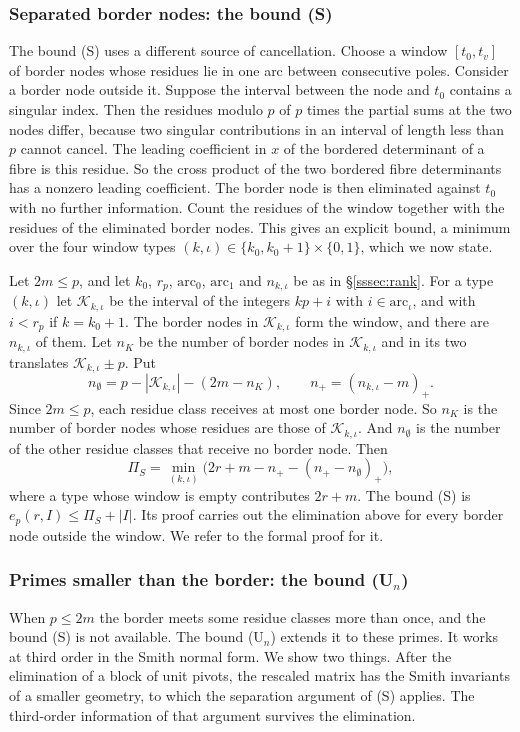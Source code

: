 \documentclass[11pt]{amsart}
\theoremstyle{definition}
\theoremstyle{remark}
\numberwithin{equation}{section}
\begin{document}
\subsubsection{Separated border nodes: the bound (S)}\label{ssec:sep}
The bound (S) uses a different source of cancellation. Choose a window $[t_0,t_v]$ of border nodes whose residues lie in
one arc between consecutive poles. Consider a border node outside it. Suppose the interval between the node and $t_0$
contains a singular index. Then the residues modulo $p$ of $p$ times the partial sums at the two nodes differ, because
two singular contributions in an interval of length less than $p$ cannot cancel. The leading coefficient in $x$ of the
bordered determinant of a fibre is this residue. So the cross product of the two bordered fibre determinants has a
nonzero leading coefficient. The border node is then eliminated against $t_0$ with no further information. Count the
residues of the window together with the residues of the eliminated border nodes. This gives an explicit bound, a
minimum over the four window types $(k,\iota)\in\{k_0,k_0+1\}\times\{0,1\}$, which we now state.

Let $2m\le p$, and let $k_0$, $r_p$, $\mathrm{arc}_0$, $\mathrm{arc}_1$ and $n_{k,\iota}$ be as in \S\ref{sssec:rank}.
For a type $(k,\iota)$ let $\mathcal K_{k,\iota}$ be the interval of the integers $kp+i$ with $i\in\mathrm{arc}_\iota$,
and with $i<r_p$ if $k=k_0+1$. The border nodes in $\mathcal K_{k,\iota}$ form the window, and there are $n_{k,\iota}$ of
them. Let $n_K$ be the number of border nodes in $\mathcal K_{k,\iota}$ and in its two translates
$\mathcal K_{k,\iota}\pm p$. Put
\[
 n_\emptyset=p-|\mathcal K_{k,\iota}|-(2m-n_K),\qquad n_+=(n_{k,\iota}-m)_+ .
\]
Since $2m\le p$, each residue class receives at most one border node. So $n_K$ is the number of border nodes whose
residues are those of $\mathcal K_{k,\iota}$. And $n_\emptyset$ is the number of the other residue classes that receive
no border node. Then
\begin{equation}\label{eq:PiS}
 \Pi_S=\min_{(k,\iota)}\bigl(2r+m-n_+-(n_+-n_\emptyset)_+\bigr),
\end{equation}
where a type whose window is empty contributes $2r+m$. The bound (S) is $e_p(r,I)\le\Pi_S+|I|$. Its proof carries out the
elimination above for every border node outside the window. We refer to the formal proof for it.

\subsubsection{Primes smaller than the border: the bound (U$_n$)}\label{sssec:wrap}
When $p\le2m$ the border meets some residue classes more than once, and the bound (S) is not available. The bound (U$_n$)
extends it to these primes. It works at third order in the Smith normal form. We show two things. After the elimination
of a block of unit pivots, the rescaled matrix has the Smith invariants of a smaller geometry, to which the separation
argument of (S) applies. The third-order information of that argument survives the elimination.
\end{document}
